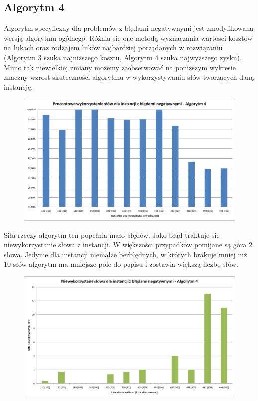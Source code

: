 \documentclass[a4paper,10pt]{article}
\begin{document}
\subsection{Algorytm 4}

Algorytm specyficzny dla problemów z błędami negatywnymi jest zmodyfikowaną wersją algorytmu ogólnego. Różnią się one metodą wyznaczania wartości kosztów na łukach oraz rodzajem łuków najbardziej porządanych w rozwiązaniu (Algorytm 3 szuka najniższego kosztu, Algorytm 4 szuka najwyższego zysku). Mimo tak niewielkiej zmiany możemy zaobserwować na poniższym wykresie znaczny wzrost skuteczności algorytmu w wykorzystywaniu słów tworzących daną instancję.

\begin{figure}[h]
  \footnotesize\centering
  \includegraphics[width=\textwidth,keepaspectratio]{percentageUsedWords_negative.png}
\end{figure}

Siłą rzeczy algorytm ten popełnia mało błędów. Jako błąd traktuje się niewykorzystanie słowa z instancji. W większości przypadków pomijane są góra 2 słowa. Jedynie dla instancji niemalże bezbłędnych, w których brakuje mniej niż 10 słów algorytm ma mniejsze pole do popisu i zostawia większą liczbę słów.

\begin{figure}[h]
  \footnotesize\centering
  \includegraphics[width=\textwidth,keepaspectratio]{unusedWords_negative.png}
\end{figure}
\end{document}
